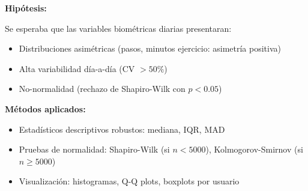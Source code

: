 \documentclass[12pt,letterpaper,twoside]{report}
\begin{document}
\begin{hipotesisbox}
\textbf{Hipótesis:}

Se esperaba que las variables biométricas diarias presentaran:
\begin{itemize}[noitemsep]
    \item Distribuciones asimétricas (pasos, minutos ejercicio: asimetría positiva)
    \item Alta variabilidad día-a-día (CV $> 50\%$)
    \item No-normalidad (rechazo de Shapiro-Wilk con $p<0.05$)
\end{itemize}
\end{hipotesisbox}

\begin{estadisticobox}
\textbf{Métodos aplicados:}

\begin{itemize}[noitemsep]
    \item Estadísticos descriptivos robustos: mediana, IQR, MAD
    \item Pruebas de normalidad: Shapiro-Wilk (si $n<5000$), Kolmogorov-Smirnov (si $n \geq 5000$)
    \item Visualización: histogramas, Q-Q plots, boxplots por usuario
\end{itemize}
\end{estadisticobox}
\end{document}
